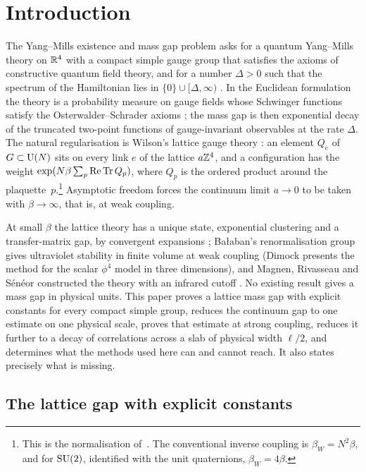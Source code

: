 \section{Introduction}\label{sec:intro}

The Yang--Mills existence and mass gap problem asks for a quantum
Yang--Mills theory on $\mathbb{R}^4$ with a compact simple gauge group that satisfies
the axioms of constructive quantum field theory, and for a number $\Delta>0$
such that the spectrum of the Hamiltonian lies in $\{0\}\cup[\Delta,\infty)$
\cite{JW06}. In the Euclidean formulation the theory is a probability measure
on gauge fields whose Schwinger functions satisfy the Osterwalder--Schrader
axioms \cite{OS73,OS75}; the mass gap is then exponential decay of the
truncated two-point functions of gauge-invariant observables at the rate
$\Delta$. The natural regularisation is Wilson's lattice gauge theory
\cite{Wil74}: an element $Q_e$ of $G\subset\mathrm{U}(N)$ sits on every link $e$ of the
lattice $a\mathbb{Z}^4$, and a configuration has the weight
$\exp(N\beta\sum_p\operatorname{Re}\operatorname{Tr} Q_p)$, where $Q_p$ is the ordered product around the
plaquette~$p$.\footnote{This is the normalisation of~\cite{SZZ23,BB26a}. The
conventional inverse coupling is $\beta_W=N^2\beta$, and for $\mathrm{SU}(2)$,
identified with the unit quaternions, $\beta_W=4\beta$.} Asymptotic freedom
forces the continuum limit $a\to0$ to be taken with $\beta\to\infty$, that is,
at weak coupling.

At small $\beta$ the lattice theory has a unique state, exponential clustering
and a transfer-matrix gap, by convergent expansions \cite{OSei78,Sei82};
Ba{\l}aban's renormalisation group \cite{Bal84a,Bal85a,Bal89b} gives ultraviolet
stability in finite volume at weak coupling (Dimock \cite{Dim13} presents the
method for the scalar $\phi^4$ model in three dimensions), and Magnen, Rivasseau and S\'en\'eor constructed the theory with an
infrared cutoff \cite{MRS93}. No existing result gives a mass gap in physical
units. This paper proves a lattice mass gap with explicit constants for every
compact simple group, reduces the continuum gap to one estimate on one
physical scale, proves that estimate at strong coupling, reduces it further to
a decay of correlations across a slab of physical width $\ell/2$, and
determines what the methods used here can and cannot reach. It also states
precisely what is missing.

\subsection{The lattice gap with explicit constants}

